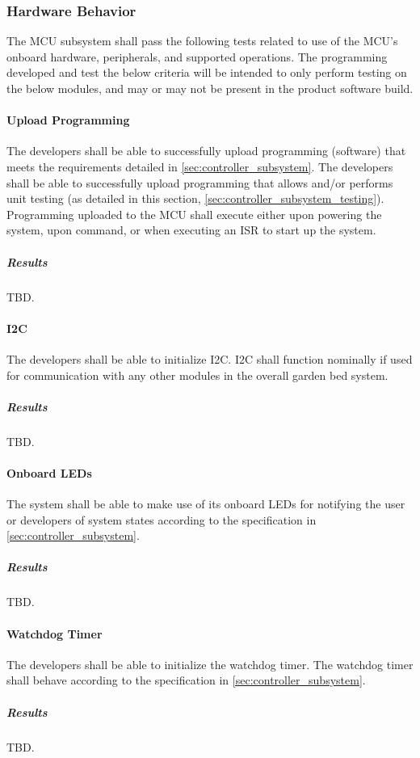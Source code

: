 \subsubsection{Hardware Behavior}
The MCU subsystem shall pass the following tests related to use of the
MCU's onboard hardware, peripherals, and supported operations. The
programming developed and test the below criteria will be intended to only
perform testing on the below modules, and may or may not be present in the
product software build.

\paragraph{Upload Programming} The developers shall be able to successfully
upload programming (software) that meets the requirements detailed in
\autoref{sec:controller_subsystem}. The developers shall be able to
successfully upload programming that allows and/or performs unit testing
(as detailed in this section, \autoref{sec:controller_subsystem_testing}).
Programming uploaded to the MCU shall execute either upon powering the
system, upon command, or when executing an ISR to start up the system.
\subparagraph{Results} TBD.

\paragraph{I2C} The developers shall be able to initialize I2C. I2C shall
function nominally if used for communication with any other modules in the
overall garden bed system.
\subparagraph{Results} TBD.

\paragraph{Onboard LEDs} The system shall be able to make use of its onboard
LEDs for notifying the user or developers of system states according to the specification in \autoref{sec:controller_subsystem}.
\subparagraph{Results} TBD.

\paragraph{Watchdog Timer} The developers shall be able to initialize the
watchdog timer. The watchdog timer shall behave according to the specification in \autoref{sec:controller_subsystem}.
\subparagraph{Results} TBD.

